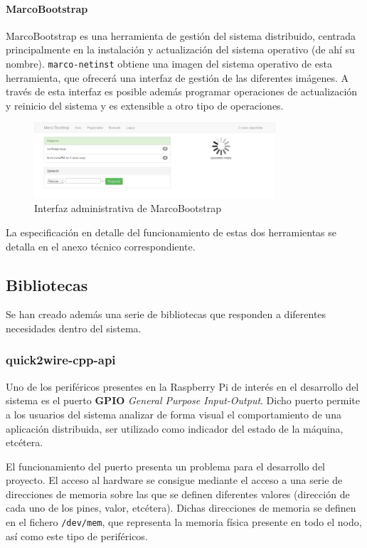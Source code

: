 \paragraph{MarcoBootstrap\\}
\label{marcobootstrap}
MarcoBootstrap es una herramienta de gestión del sistema distribuido, centrada principalmente en la instalación y actualización del sistema operativo (de ahí su nombre). \texttt{marco-netinst} obtiene una imagen del sistema operativo de esta herramienta, que ofrecerá una interfaz de gestión de las diferentes imágenes. A través de esta interfaz es posible además programar operaciones de actualización y reinicio del sistema y es extensible a otro tipo de operaciones.

\begin{figure}[H]
	\centering
	\includegraphics[width=0.8\textwidth]{Chapters/Chapter5/Figures/marcobootstrap}
	\caption{Interfaz administrativa de MarcoBootstrap}
\end{figure}

La especificación en detalle del funcionamiento de estas dos herramientas se detalla en el anexo técnico correspondiente.

\subsection{Bibliotecas}

Se han creado además una serie de bibliotecas que responden a diferentes necesidades dentro del sistema.

\subsubsection{quick2wire-cpp-api}

Uno de los periféricos presentes en la Raspberry Pi de interés en el desarrollo del sistema es el puerto \textbf{GPIO} \textit{General Purpose Input-Output}. Dicho puerto permite a los usuarios del sistema analizar de forma visual el comportamiento de una aplicación distribuida, ser utilizado como indicador del estado de la máquina, etcétera.

El funcionamiento del puerto presenta un problema para el desarrollo del proyecto. El acceso al hardware se consigue mediante el acceso a una serie de direcciones de memoria sobre las que se definen diferentes valores (dirección de cada uno de los pines, valor, etcétera). Dichas direcciones de memoria se definen en el fichero \texttt{/dev/mem}, que representa la memoria física presente en todo el nodo, así como este tipo de periféricos.


